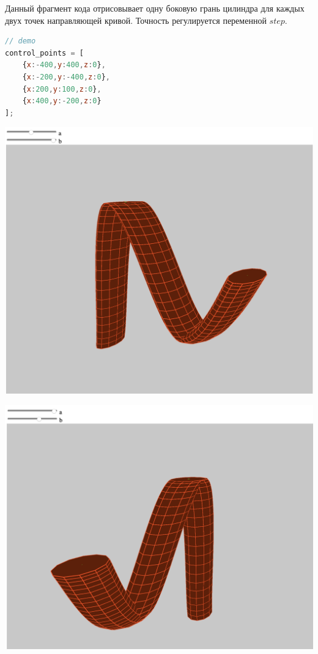 Данный фрагмент кода отрисовывает одну боковую грань цилиндра для каждых двух точек направляющей кривой. Точность регулируется переменной $step$.

\begin{lstlisting}[language=Javascript]
// demo
control_points = [
    {x:-400,y:400,z:0},
    {x:-200,y:-400,z:0},
    {x:200,y:100,z:0},
    {x:400,y:-200,z:0}
];
\end{lstlisting}

\includegraphics[scale=0.35]{pictures/2.png}

\includegraphics[scale=0.35]{pictures/3.png}

